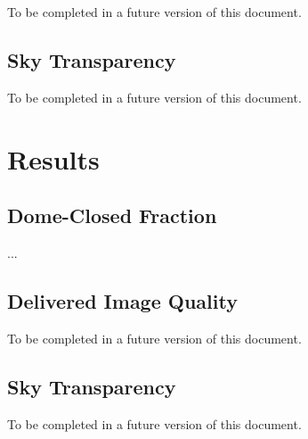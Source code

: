 \documentclass[12pt]{article}
\begin{document}
To be completed in a future version of this document.

\subsection{Sky Transparency}

To be completed in a future version of this document.

\section{Results}

\subsection{Dome-Closed Fraction}

...

\subsection{Delivered Image Quality}

To be completed in a future version of this document.

\subsection{Sky Transparency}

To be completed in a future version of this document.



\end{document}
